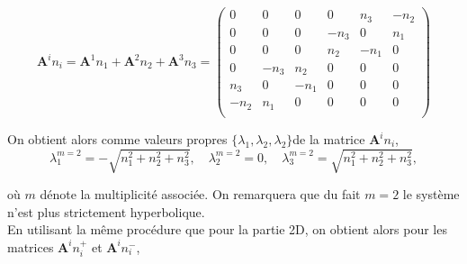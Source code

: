 \documentclass[a4paper,oneside,10pt]{report}
\begin{document}
\begin{equation}
\mathbf{A}^i n_i = \mathbf{A}^1 n_1 + \mathbf{A}^2 n_2  + \mathbf{A}^3 n_3 =
\begin{pmatrix}
0 & 0 & 0 & 0 & n_3 & -n_2\\
0 & 0 & 0 & -n_3 & 0 & n_1\\
0 & 0 & 0 & n_2 & -n_1 & 0\\
0 & -n_3 & n_2 & 0 & 0 & 0\\
n_3 & 0 & -n_1 & 0 & 0 & 0\\
-n_2 & n_1 & 0 & 0 & 0 & 0\\
\end{pmatrix}
\end{equation}


On obtient alors comme valeurs propres $\{\lambda_1,\lambda_2,\lambda_2\}$de la matrice $\mathbf{A}^i n_i$, 
\begin{equation}
\label{eq:vp}
\lambda_1^{m=2} = -\sqrt{n_1^2 + n_2^2 + n_3^2},\quad \lambda_2^{m=2} =0,\quad \lambda_3^{m=2}  =  \sqrt{n_1^2 + n_2^2 + n_3^2},
\end{equation}

où $m$ dénote la multiplicité associée. On remarquera que du fait $m=2$ le système n'est plus strictement hyperbolique. \\
En utilisant la même procédure que pour la partie 2D, on obtient alors pour les matrices $\mathbf{A}^in_i^+$ et $\mathbf{A}^in_i^-$,
\end{document}
